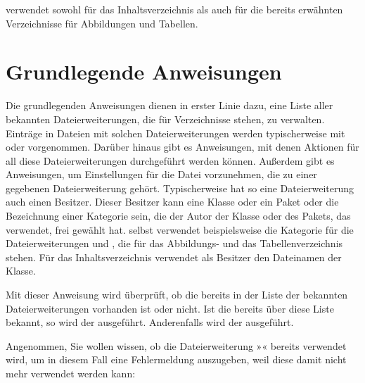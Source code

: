 \KOMAScript{} verwendet  sowohl für das Inhaltsverzeichnis
als auch für die bereits erwähnten Verzeichnisse für Abbildungen und Tabellen.


\section{Grundlegende Anweisungen}

Die grundlegenden Anweisungen dienen in erster Linie dazu, eine Liste aller
bekannten Dateierweiterungen, die für
Verzeichnisse stehen, zu verwalten. Einträge in Dateien mit solchen
Dateierweiterungen werden typischerweise mit
 oder
 vorgenommen. Darüber hinaus gibt es
Anweisungen, mit denen Aktionen für all diese Dateierweiterungen durchgeführt
werden können. Außerdem gibt es Anweisungen, um Einstellungen für die Datei
vorzunehmen, die zu einer gegebenen Dateierweiterung gehört. Typischerweise
hat so eine Dateierweiterung auch einen
Besitzer. Dieser Besitzer kann eine Klasse oder ein
Paket oder die Bezeichnung einer Kategorie sein, die der Autor der Klasse oder
des Pakets, das  verwendet, frei gewählt hat. \KOMAScript{}
selbst verwendet beispielsweise die Kategorie  für die
Dateierweiterungen  und , die für das Abbildungs- und das
Tabellenverzeichnis stehen. Für das Inhaltsverzeichnis verwendet \KOMAScript{}
als Besitzer den Dateinamen der Klasse.

\begin{Declaration}
\end{Declaration}
Mit dieser Anweisung wird überprüft, ob
die  bereits in der Liste der bekannten
Dateierweiterungen vorhanden ist oder nicht. Ist die 
bereits über diese Liste bekannt, so wird der 
ausgeführt. Anderenfalls wird der  ausgeführt.
\begin{Example}
  Angenommen, Sie wollen wissen, ob die Dateierweiterung »« bereits
  verwendet wird, um in diesem Fall eine Fehlermeldung auszugeben, weil diese
  damit nicht mehr verwendet werden kann:
\begin{lstcode}
\end{lstcode}
\end{Example}
\EndIndexGroup%
\ExampleEndFix


